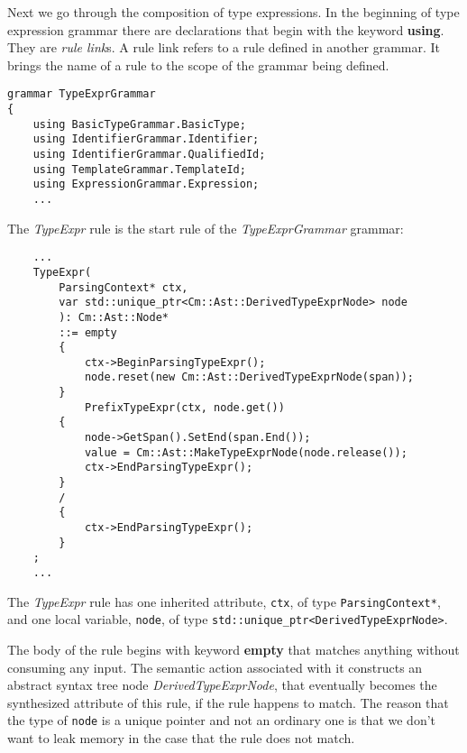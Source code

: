 \documentclass[a4paper,oneside,11pt]{book}
\theoremstyle{definition}
\begin{document}
Next we go through the composition of type expressions.
In the beginning of type expression grammar there are declarations that begin with the keyword \textbf{using}.
They are \emph{rule link}s. A rule link refers to a rule defined in another grammar.
It brings the name of a rule to the scope of the grammar being defined.

\lstset{language=cmpg}
\begin{lstlisting}
grammar TypeExprGrammar
{
    using BasicTypeGrammar.BasicType;
    using IdentifierGrammar.Identifier;
    using IdentifierGrammar.QualifiedId;
    using TemplateGrammar.TemplateId;
    using ExpressionGrammar.Expression;
    ...
\end{lstlisting}

\begin{flushleft}
The \emph{TypeExpr} rule is the start rule of the \emph{TypeExprGrammar} grammar:
\end{flushleft}

\lstset{language=cmpg}
\begin{lstlisting}
    ...
    TypeExpr(
        ParsingContext* ctx,
        var std::unique_ptr<Cm::Ast::DerivedTypeExprNode> node
        ): Cm::Ast::Node*
        ::= empty
        {
            ctx->BeginParsingTypeExpr();
            node.reset(new Cm::Ast::DerivedTypeExprNode(span));
        }
            PrefixTypeExpr(ctx, node.get())
        {
            node->GetSpan().SetEnd(span.End());
            value = Cm::Ast::MakeTypeExprNode(node.release());
            ctx->EndParsingTypeExpr();
        }
        /
        {
            ctx->EndParsingTypeExpr();
        }
    ;
    ...
\end{lstlisting}

\begin{flushleft}
The \emph{TypeExpr} rule has one inherited attribute, \verb|ctx|, of type \verb|ParsingContext*|, and
one local variable, \verb|node|, of type \verb|std::unique_ptr<DerivedTypeExprNode>|.
\end{flushleft}

The body of the rule begins with keyword \textbf{empty} that matches anything without consuming any input.
The semantic action associated with it constructs an abstract syntax tree node \emph{DerivedTypeExprNode},
that eventually becomes the synthesized attribute of this rule, if the rule happens to match.
The reason that the type of \verb|node| is a unique pointer and not an ordinary one is that we don't
want to leak memory in the case that the rule does not match.
\end{document}
